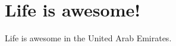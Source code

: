 \documentclass{article}
\begin{document}
\section{Life is awesome!}
\label{sec:life-awesome}

Life is awesome in the United Arab Emirates.
\end{document}
